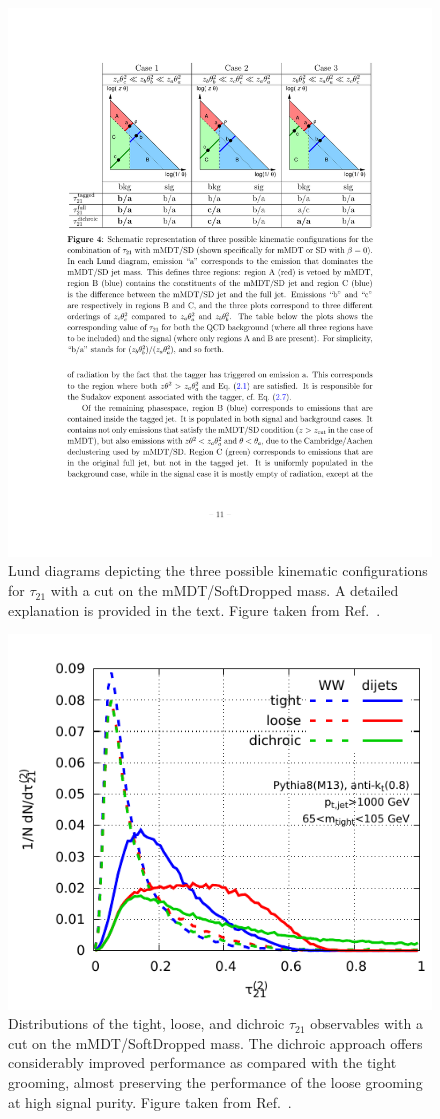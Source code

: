 \documentclass[11pt,letterpaper]{article}
\begin{document}
\begin{figure}[t]
\begin{center}
\includegraphics[width=0.9\columnwidth]{jetsub_2prong_dichroic_placeholder}
\end{center}
\caption{Lund diagrams depicting the three possible kinematic configurations for $\tau_{21}$ with a cut on the mMDT/SoftDropped mass. A detailed explanation is provided in the text. Figure taken from Ref.~\cite{Salam:2016yht}.}
\label{jetsub_2prong_fig:dichroic}
\end{figure}

\begin{figure}[t]
\begin{center}
\includegraphics[width=0.5\columnwidth]{jetsub_2prong_dichroic-illust}
\end{center}
\caption{Distributions of the tight, loose, and dichroic $\tau_{21}$ observables with a cut on the mMDT/SoftDropped mass. The dichroic approach offers considerably improved performance as compared with the tight grooming, almost preserving the performance of the loose grooming at high signal purity.  Figure taken from Ref.~\cite{Salam:2016yht}.}
\label{jetsub_2prong_fig:dichroic_distribution}
\end{figure}
\end{document}
